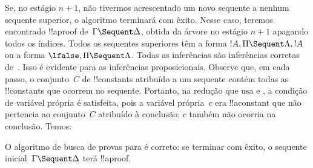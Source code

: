 \documentclass[../../../include/open-logic-section]{subfiles}
\begin{document}
Se, no estágio $n+1$, não tivermos acrescentado um novo sequente a
nenhum sequente superior, o algoritmo terminará com êxito. Nesse caso,
teremos encontrado !!a{proof} de~$\Gamma \Sequent \Delta$, obtida da
árvore no estágio $n+1$ apagando todos os índices. Todos os sequentes
superiores têm a forma $!A, \Pi \Sequent \Lambda, !A$ ou a forma
$\lfalse, \Pi \Sequent \Lambda$. Todas as inferências são inferências
corretas de~. Isso é evidente para as inferências
proposicionais. Observe que, em cada passo, o conjunto~$C$ de
!!{constant}s atribuído a um sequente contém todas as !!{constant}s que
ocorrem no sequente. Portanto, na redução que usa \LeftR{\lexists} e
\RightR{\lforall}, a condição de variável própria é satisfeita, pois a
variável própria~$c$ era !!a{constant} que não pertencia ao conjunto~$C$
atribuído à conclusão; $c$ também não ocorria na conclusão. Temos:

\begin{prop}
O algoritmo de busca de provas para  é correto: se terminar
com êxito, o sequente inicial~$\Gamma \Sequent \Delta$ terá !!a{proof}.
\end{prop}
\end{document}
